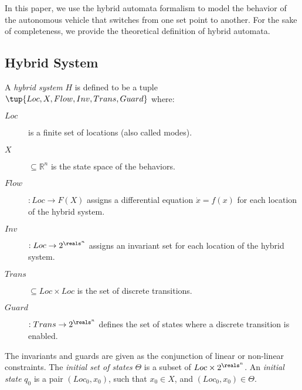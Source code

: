 In this paper, we use the hybrid automata formalism to model the behavior of the autonomous vehicle that switches from one set point to another. For the sake of completeness, we provide the theoretical definition of hybrid automata.

\subsection{Hybrid System}
\begin{definition}
\label{def:hybridSystem}
 A \emph{hybrid system} $H$ is defined to be a tuple $\tup{Loc, X, Flow, Inv, Trans, Guard}$ where:
\begin{description}
\item[$Loc$] is a finite set of locations (also called modes).
\item[$X$] $\subseteq \mathbb{R}^n$ is the state space of the behaviors.
\item[$Flow$] $: Loc \rightarrow F(X)$ assigns a differential equation $\dot{x} = f(x)$ for each location of the hybrid system.
\item[$Inv$] $: Loc \rightarrow 2^{\reals^n}$ assigns an invariant set for each location of the hybrid system.
\item[$Trans$] $\subseteq Loc \times Loc$ is the set of discrete transitions.
\item[$Guard$] $: Trans \rightarrow 2^{\reals^n}$ defines the set of states where a discrete transition is enabled.
\end{description}
The invariants and guards are given as the conjunction of linear or non-linear constraints. The \textit{initial set of states} $\Theta$ is a subset of $Loc \times 2^{\reals^n}$. An \textit{initial state} $q_0$ is a pair $(Loc_0, x_0)$, such that $x_0 \in X$, and
$(Loc_0, x_0) \in \Theta$.
\end{definition}
%


